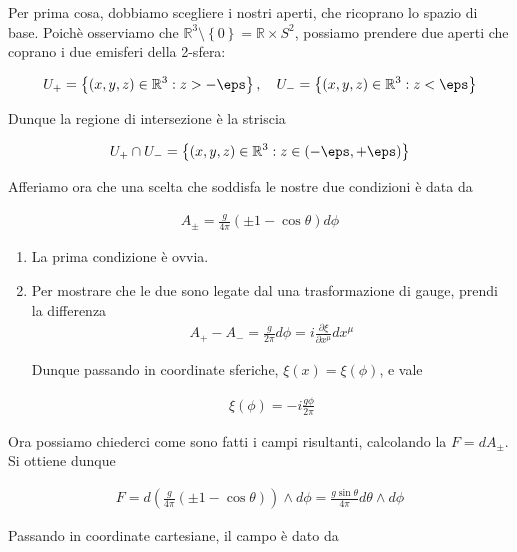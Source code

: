 \documentclass{report}
\begin{document}
Per prima cosa, dobbiamo scegliere i nostri aperti, che ricoprano lo spazio di base. Poichè osserviamo che \(\mathbb{R}^3 \setminus \left\{0\right\} = \mathbb{R}\times S^2\), possiamo prendere due aperti che coprano i due emisferi della 2-sfera: 

\begin{align}
    U_+ = \left\{(x, y, z) \in \mathbb{R}^3 : z > -\eps\right\}, \quad U_- = \left\{(x, y, z) \in \mathbb{R}^3 : z < \eps\right\} 
\end{align}

Dunque la regione di intersezione è la striscia 

\begin{align}
    U_+ \cap U_- = \left\{(x, y, z) \in \mathbb{R}^3 : z \in (-\eps, +\eps) \right\}
\end{align}

Afferiamo ora che una scelta che soddisfa le nostre due condizioni è data da 

\begin{align}
    A_{\pm} = \frac{g}{4\pi}(\pm 1 - \cos\theta)d\phi
\end{align}

\begin{enumerate}
    \item La prima condizione è ovvia. 
    \item Per mostrare che le due sono legate dal una trasformazione di gauge, prendi la differenza 
    \begin{align}
        A_+ - A_- = \frac{g}{2\pi}d\phi = i \frac{\partial \xi}{\partial x^{\mu}}dx^{\mu}
    \end{align}

    Dunque passando in coordinate sferiche, \(\xi(x) = \xi(\phi)\), e vale 

    \begin{align}
        \xi(\phi) = -i \frac{g\phi}{2\pi}
    \end{align}
\end{enumerate}


Ora possiamo chiederci come sono fatti i campi risultanti, calcolando la \(F = dA_{\pm}\). Si ottiene dunque 

\begin{align}
    F = d\left(\frac{g}{4\pi}(\pm 1 -\cos\theta) \right) \wedge d\phi = \frac{g \sin\theta}{4\pi} d\theta \wedge d\phi
\end{align}

Passando in coordinate cartesiane, il campo è dato da 
\end{document}
